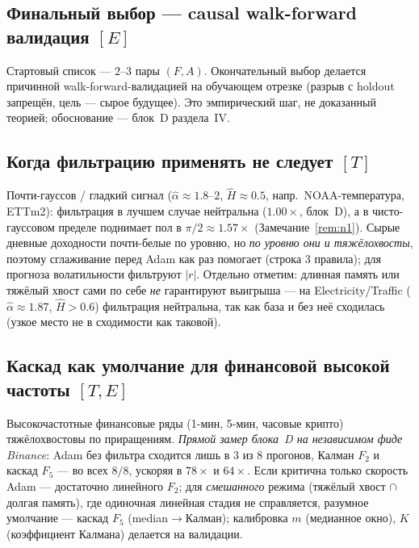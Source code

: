 \documentclass[conference]{IEEEtran}
\theoremstyle{plain}
\theoremstyle{definition}
\begin{document}
\subsection{Финальный выбор --- causal walk-forward валидация $[E]$}
Стартовый список --- 2--3 пары $(F,A)$. Окончательный выбор делается
причинной walk-forward-валидацией на обучающем отрезке (разрыв с
holdout запрещён, цель --- сырое будущее). Это эмпирический шаг, не
доказанный теорией; обоснование --- блок~D раздела~IV.

\subsection{Когда фильтрацию применять не следует $[T]$}
Почти-гауссов / гладкий сигнал ($\hat\alpha\approx1.8$--$2$,
$\hat H\approx0.5$, напр.~NOAA-температура, ETTm2): фильтрация в лучшем
случае нейтральна ($1.00\times$, блок~D), а в чисто-гауссовом пределе
поднимает пол в $\pi/2{\approx}1.57\times$ (Замечание~\ref{rem:n1}).
Сырые дневные доходности почти-белые по уровню, но \emph{по уровню они
и тяжёлохвосты}, поэтому сглаживание перед Adam как раз помогает (строка
3 правила); для прогноза волатильности фильтруют $|r|$. Отдельно
отметим: длинная память или тяжёлый хвост сами по себе \emph{не}
гарантируют выигрыша --- на Electricity/Traffic ($\hat\alpha\approx1.87$,
$\hat H>0.6$) фильтрация нейтральна, так как база и без неё сходилась
(узкое место не в сходимости как таковой).

\subsection{Каскад как умолчание для финансовой высокой частоты $[T,E]$}
Высокочастотные финансовые ряды (1-мин, 5-мин, часовые крипто)
тяжёлохвостовы по приращениям. \emph{Прямой замер блока~D на независимом
фиде Binance}: Adam без фильтра сходится лишь в $3$ из $8$ прогонов,
Калман $F_2$ и каскад $F_5$ --- во всех $8/8$, ускоряя в $78\times$ и
$64\times$. Если критична только скорость Adam --- достаточно линейного
$F_2$; для \emph{смешанного} режима (тяжёлый хвост $\cap$ долгая
память), где одиночная линейная стадия не справляется, разумное
умолчание --- каскад $F_5$ (median$\to$Калман); калибровка $m$ (медианное окно),
$K$ (коэффициент Калмана) делается на валидации.
\end{document}
